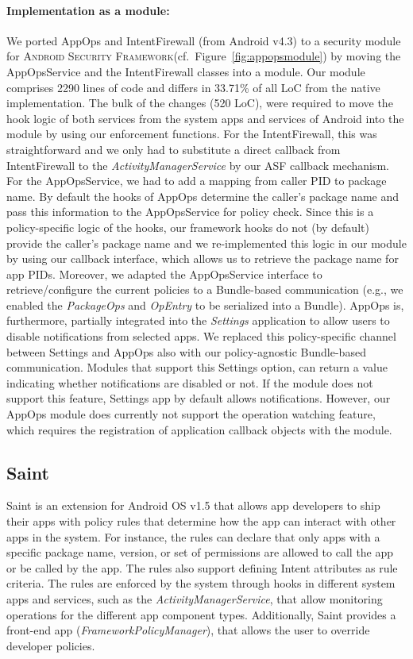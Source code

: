 \documentclass[letterpaper,twocolumn,10pt]{article}
\newcommand{\OURNAME}{\textsc{Android Security Framework}\xspace}
\newcommand{\OURSHORT}{\textsc{ASF}\xspace}
\begin{document}
\paragraph{Implementation as a module:} We ported AppOps and IntentFirewall (from Android v4.3) to a security module for \OURNAME (cf.~Figure~\ref{fig:appopsmodule}) by moving the AppOpsService and the IntentFirewall classes into a module. Our module comprises 2290 lines of code and differs in 33.71\% of all LoC from the native implementation. The bulk of the changes (520 LoC), were required to  move the hook logic of both services from the system apps and services of Android into the module by using our enforcement functions. For the IntentFirewall, this was straightforward and we only had to substitute a direct callback from IntentFirewall to the \textit{ActivityManagerService} by our \OURSHORT callback mechanism. For the AppOpsService, we had to add a mapping from caller PID to package name. By default the hooks of AppOps determine the caller's package name and pass this information to the AppOpsService for policy check. Since this is a policy-specific logic of the hooks, our framework hooks do not (by default) provide the caller's package name and we re-implemented this logic in our module by using our callback interface, which allows us to retrieve the package name for app PIDs. Moreover, we adapted the AppOpsService interface to retrieve/configure the current policies to a Bundle-based communication (e.g., we enabled the \textit{PackageOps} and \textit{OpEntry} to be serialized into a Bundle). AppOps is, furthermore, partially integrated into the \textit{Settings} application to allow users to disable notifications from selected apps. We replaced this policy-specific channel between Settings and AppOps also with our policy-agnostic Bundle-based communication. Modules that support this Settings option, can return a value indicating whether notifications are disabled or not. If the module does not support this feature, Settings app by default allows notifications. However, our AppOps module does currently not support the operation watching feature, which requires the registration of application callback objects with the module.


\subsection{Saint~\cite{OnMcEnMc_09:Saint}}

Saint is an extension for Android OS v1.5 that allows app developers to ship their apps with policy rules that determine how the app can interact with other apps in the system. For instance, the rules can declare that only apps with a specific package name, version, or set of permissions are allowed to call the app or be called by the app. The rules also support defining Intent attributes as rule criteria. The rules are enforced by the system through hooks in different system apps and services, such as the \textit{ActivityManagerService}, that allow monitoring operations for the different app component types. Additionally, Saint provides a front-end app (\textit{FrameworkPolicyManager}), that allows the user to override developer policies.
\end{document}

